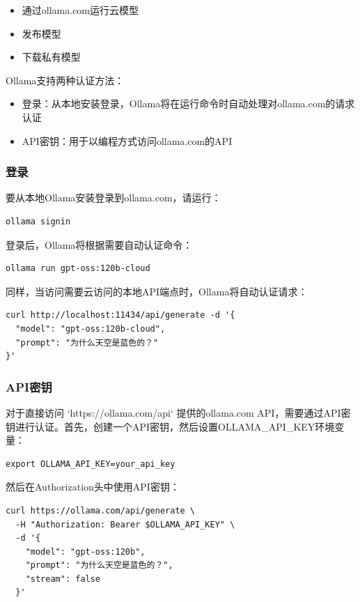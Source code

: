 \documentclass[12pt,UTF8]{ctexbook}
\begin{document}
\begin{itemize}
  \item 通过ollama.com运行云模型
  \item 发布模型
  \item 下载私有模型
\end{itemize}

Ollama支持两种认证方法：

\begin{itemize}
  \item 登录：从本地安装登录，Ollama将在运行命令时自动处理对ollama.com的请求认证
  \item API密钥：用于以编程方式访问ollama.com的API
\end{itemize}

\subsubsection{登录}

要从本地Ollama安装登录到ollama.com，请运行：

\begin{verbatim}
ollama signin
\end{verbatim}

登录后，Ollama将根据需要自动认证命令：

\begin{verbatim}
ollama run gpt-oss:120b-cloud
\end{verbatim}

同样，当访问需要云访问的本地API端点时，Ollama将自动认证请求：

\begin{verbatim}
curl http://localhost:11434/api/generate -d '{
  "model": "gpt-oss:120b-cloud",
  "prompt": "为什么天空是蓝色的？"
}'
\end{verbatim}

\subsubsection{API密钥}

对于直接访问 `https://ollama.com/api` 提供的ollama.com API，需要通过API密钥进行认证。首先，创建一个API密钥，然后设置OLLAMA_API_KEY环境变量：

\begin{verbatim}
export OLLAMA_API_KEY=your_api_key
\end{verbatim}

然后在Authorization头中使用API密钥：

\begin{verbatim}
curl https://ollama.com/api/generate \
  -H "Authorization: Bearer $OLLAMA_API_KEY" \
  -d '{
    "model": "gpt-oss:120b",
    "prompt": "为什么天空是蓝色的？",
    "stream": false
  }'
\end{verbatim}
\end{document}
